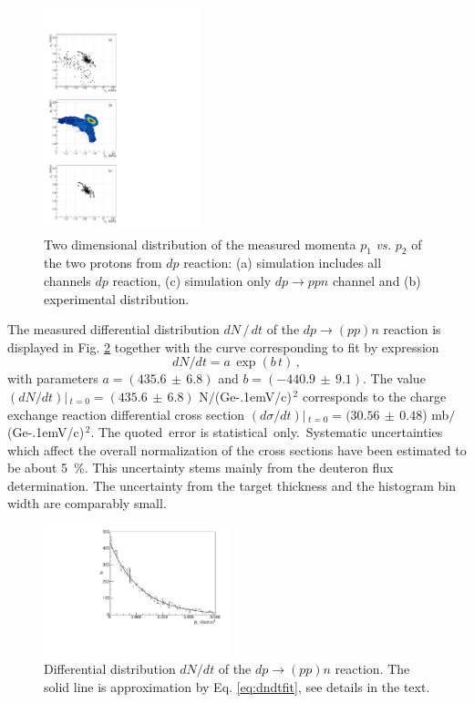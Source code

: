 \documentclass[twocolumn,epjc3]{svjour3}
\newcommand{\dpfrag} {\ensuremath{dp \rightarrow ppn}\xspace}
\newcommand{\dpchex} {\ensuremath{dp \rightarrow (pp)n}\xspace}
\newcommand{\GeVc}   {Ge\kern-.1emV/c\xspace}
\begin{document}
\begin{figure}[t]
  \centering
  \includegraphics[width=0.41\textwidth]{p1_vs_p2_1.pdf} %
  \caption{Two dimensional distribution of the measured momenta $p_1$
    \textit{vs.} $p_2$ of the two protons from $dp$ reaction: (a) simulation
    includes all channels $dp$ reaction, (c) simulation only \dpfrag channel and
    (b) experimental distribution.}
  \label{fig:p1vsp2}
\end{figure}

The measured differential distribution $dN\,/\,dt$ of the \dpchex reaction is
displayed in Fig. \ref{fig:dndt} together with the curve corresponding to fit by
expression
\begin{equation}
  \label{eq:dndtfit}
  dN/dt = a\,\exp(b\,t)\,,
\end{equation}
with parameters $a=(435.6\,\pm\,6.8)$ and $b=(-440.9\,\pm\,9.1)$. The value
$(dN/dt)|\,_{t=0}=(435.6\,\pm\,6.8)$ N$/$(\GeVc)$^{\,2}$ corresponds to the
charge exchange reaction differential cross section
$(d\sigma/dt)|\,_{t=0}=(30.56\,\pm\,0.48$) mb$/$(\GeVc)$^{\,2}$.
The quoted \,error is statistical \,only. \,Systematic uncertainties which
affect the overall normalization of the cross sections have been estimated to be
about 5~\%. This uncertainty stems mainly from the deuteron flux determination.
The uncertainty from the target thickness and the histogram bin width are
comparably small.

\begin{figure}[h]
  \centering
  \includegraphics[width=0.48\textwidth]{dp_dN.pdf}
  \caption{Differential distribution $dN/dt$ of the \dpchex reaction. The solid
    line is approximation by Eq. \eqref{eq:dndtfit}, see details in the text.}
  \label{fig:dndt}
\end{figure}
\end{document}
